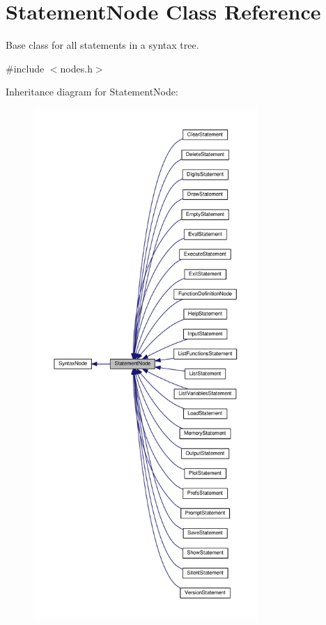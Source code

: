 \hypertarget{classStatementNode}{}\section{Statement\+Node Class Reference}
\label{classStatementNode}


Base class for all statements in a syntax tree.  




{\ttfamily \#include $<$nodes.\+h$>$}



Inheritance diagram for Statement\+Node\+:\nopagebreak
\begin{figure}[H]
\begin{center}
\leavevmode
\includegraphics[height=550pt]{classStatementNode__inherit__graph}
\end{center}
\end{figure}


